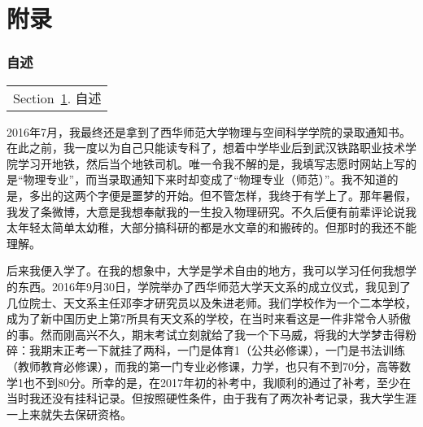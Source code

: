 \part{附录}\label{Part:Appendix}
	
	\section{自述}\label{sec:account}
		\begin{margintable}\vspace{1.4in}\footnotesize
			\begin{tabularx}{\marginparwidth}{|X}
			Section~\ref{sec:account}. 自述\\
			\end{tabularx}
        \end{margintable}
        2016年7月，我最终还是拿到了西华师范大学物理与空间科学学院的录取通知书。在此之前，我一度以为自己只能读专科了，想着中学毕业后到武汉铁路职业技术学院学习开地铁，然后当个地铁司机。唯一令我不解的是，我填写志愿时网站上写的是“物理专业”，而当录取通知下来时却变成了“物理专业（师范）”。我不知道的是，多出的这两个字便是噩梦的开始。但不管怎样，我终于有学上了。那年暑假，我发了条微博，大意是我想奉献我的一生投入物理研究。不久后便有前辈评论说我太年轻太简单太幼稚，大部分搞科研的都是水文章的和搬砖的。但那时的我还不能理解。

	    后来我便入学了。在我的想象中，大学是学术自由的地方，我可以学习任何我想学的东西。2016年9月30日，学院举办了西华师范大学天文系的成立仪式，我见到了几位院士、天文系主任邓李才研究员以及朱进老师。我们学校作为一个二本学校，成为了新中国历史上第7所具有天文系的学校，在当时来看这是一件非常令人骄傲的事。然而刚高兴不久，期末考试立刻就给了我一个下马威，将我的大学梦击得粉碎：我期末正考一下就挂了两科，一门是体育1（公共必修课），一门是书法训练（教师教育必修课），而我的第一门专业必修课，力学，也只有不到70分，高等数学1也不到80分。所幸的是，在2017年初的补考中，我顺利的通过了补考，至少在当时我还没有挂科记录。但按照硬性条件，由于我有了两次补考记录，我大学生涯一上来就失去保研资格。
	
